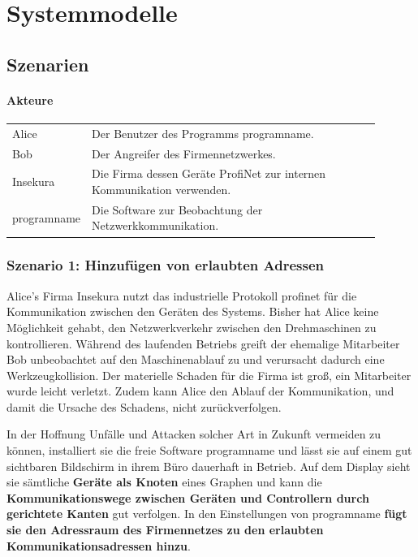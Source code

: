 \chapter{Systemmodelle}



\section{Szenarien}

\subsubsection*{Akteure}

\begin{tabular}{lp{0.9\linewidth}}

Alice & Der Benutzer des Programms \gls{programname}. \\

Bob & Der Angreifer des Firmennetzwerkes. \\

Insekura & Die Firma dessen Geräte ProfiNet zur internen Kommunikation verwenden. \\

\gls{programname} & Die Software zur Beobachtung der Netzwerkkommunikation.\\

\end{tabular}

\subsection{Szenario 1: Hinzufügen von erlaubten Adressen}

Alice's Firma Insekura nutzt das industrielle Protokoll \gls{profinet} für die Kommunikation zwischen den Geräten des Systems. Bisher hat Alice keine Möglichkeit gehabt, den Netzwerkverkehr zwischen den Drehmaschinen zu kontrollieren. Während des laufenden Betriebs greift der ehemalige Mitarbeiter Bob unbeobachtet auf den Maschinenablauf zu und verursacht dadurch eine Werkzeugkollision. Der materielle Schaden für die Firma ist groß, ein Mitarbeiter wurde leicht verletzt. Zudem kann Alice den Ablauf der Kommunikation, und damit die Ursache des Schadens, nicht zurückverfolgen.

In der Hoffnung Unfälle und Attacken solcher Art in Zukunft vermeiden zu können, installiert sie die freie Software \gls{programname} und lässt sie auf einem gut sichtbaren Bildschirm in ihrem Büro dauerhaft in Betrieb. Auf dem Display sieht sie sämtliche \textbf{Geräte als Knoten} eines Graphen und kann die \textbf{Kommunikationswege zwischen Geräten und Controllern durch gerichtete Kanten} gut verfolgen. In den Einstellungen von \gls{programname} \textbf{fügt sie den Adressraum des Firmennetzes zu den erlaubten Kommunikationsadressen hinzu}.

